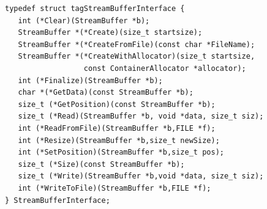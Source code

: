 \begin{verbatim}
typedef struct tagStreamBufferInterface {
   int (*Clear)(StreamBuffer *b);
   StreamBuffer *(*Create)(size_t startsize);
   StreamBuffer *(*CreateFromFile)(const char *FileName);
   StreamBuffer *(*CreateWithAllocator)(size_t startsize,
                  const ContainerAllocator *allocator);
   int (*Finalize)(StreamBuffer *b);
   char *(*GetData)(const StreamBuffer *b);
   size_t (*GetPosition)(const StreamBuffer *b);
   size_t (*Read)(StreamBuffer *b, void *data, size_t siz);
   int (*ReadFromFile)(StreamBuffer *b,FILE *f);
   int (*Resize)(StreamBuffer *b,size_t newSize);
   int (*SetPosition)(StreamBuffer *b,size_t pos);
   size_t (*Size)(const StreamBuffer *b);
   size_t (*Write)(StreamBuffer *b,void *data, size_t siz);
   int (*WriteToFile)(StreamBuffer *b,FILE *f);
} StreamBufferInterface;
\end{verbatim}
